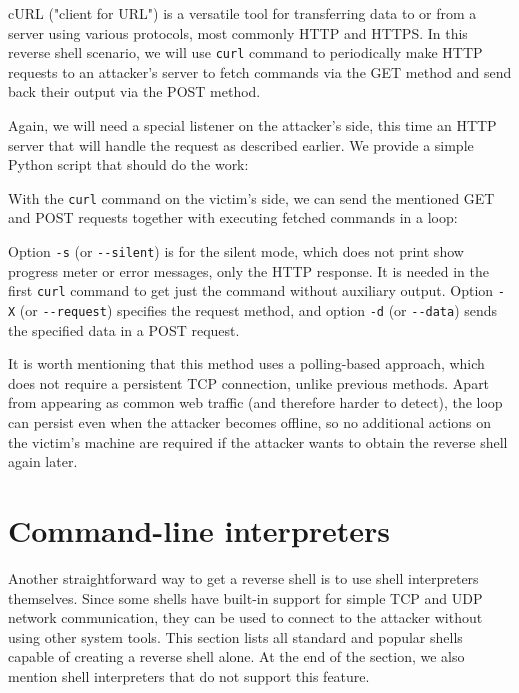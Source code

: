 
cURL ("client for URL") is a versatile tool for transferring data to or from a server using various protocols, most commonly HTTP and HTTPS. In this reverse shell scenario, we will use \texttt{curl} command to periodically make HTTP requests to an attacker's server to fetch commands via the GET method and send back their output via the POST method.

Again, we will need a special listener on the attacker's side, this time an HTTP server that will handle the request as described earlier. We provide a simple Python script that should do the work:


With the \texttt{curl} command on the victim's side, we can send the mentioned GET and POST requests together with executing fetched commands in a loop:


Option \texttt{-s} (or \texttt{-{}-silent}) is for the silent mode, which does not print show progress meter or error messages, only the HTTP response. It is needed in the first \texttt{curl} command to get just the command without auxiliary output. Option \texttt{-X} (or \texttt{-{}-request}) specifies the request method, and option \texttt{-d} (or \texttt{-{}-data}) sends the specified data in a POST request. \cite{curl-man}

It is worth mentioning that this method uses a polling-based approach, which does not require a persistent TCP connection, unlike previous methods. Apart from appearing as common web traffic (and therefore harder to detect), the loop can persist even when the attacker becomes offline, so no additional actions on the victim's machine are required if the attacker wants to obtain the reverse shell again later.


\section{Command-line interpreters}

Another straightforward way to get a reverse shell is to use shell interpreters themselves. Since some shells have built-in support for simple TCP and UDP network communication, they can be used to connect to the attacker without using other system tools. This section lists all standard and popular shells capable of creating a reverse shell alone. At the end of the section, we also mention shell interpreters that do not support this feature.

